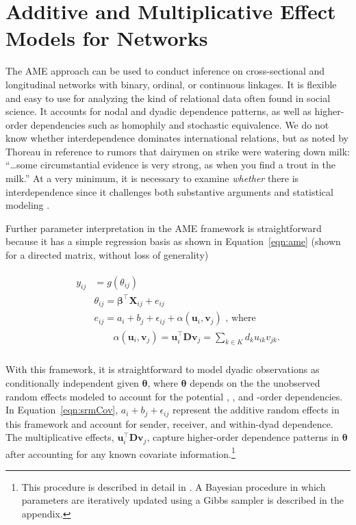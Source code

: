 \section{\textbf{Additive and Multiplicative Effect Models for Networks}}

The AME approach can be used to conduct inference on cross-sectional and longitudinal networks with binary, ordinal, or continuous linkages. It is flexible and easy to use for analyzing the kind of relational data often found in social science. It accounts for nodal and dyadic dependence patterns, as well as higher-order dependencies such as homophily and stochastic equivalence.  We do not know whether interdependence dominates international relations, but as noted by Thoreau in reference to rumors that dairymen on strike were watering down milk: ``\ldots some circumstantial evidence is very strong, as when you find a trout in the milk.'' At a very minimum, it is necessary to examine \textit{whether} there is interdependence since it challenges both substantive arguments and statistical modeling \citep{snijders:2011}. 

Further parameter interpretation in the AME framework is straightforward because it has a simple regression basis as shown in Equation~\ref{eqn:ame} (shown for a directed matrix, without loss of generality) \:

\begin{align}
\begin{aligned}
	y_{ij} &= g(\theta_{ij}) \\
	&\theta_{ij} = \bm\beta^{\top} \mathbf{X}_{ij} + e_{ij} \\
	&e_{ij} = a_{i} + b_{j}  + \epsilon_{ij} + \alpha(\textbf{u}_{i}, \textbf{v}_{j}) \text{  , where } \\
	&\qquad \alpha(\textbf{u}_{i}, \textbf{v}_{j}) = \textbf{u}_{i}^{\top} \textbf{D} \textbf{v}_{j} = \sum_{k \in K} d_{k} u_{ik} v_{jk}. \\
\label{eqn:ame}
\end{aligned}
\end{align}

With this framework, it is straightforward to model dyadic observations as conditionally independent given $\bm\theta$, where $\bm\theta$ depends on the the unobserved random effects modeled to account for the potential \first, \second, and \third-order dependencies. In Equation~\ref{eqn:srmCov}, $a_{i} + b_{j}  + \epsilon_{ij}$ represent the additive random effects in this framework and account for sender, receiver, and within-dyad dependence. The multiplicative effects, $\textbf{u}_{i}^{\top} \textbf{D} \textbf{v}_{j}$, capture higher-order dependence patterns in $\bm\theta$ after accounting for any known covariate information.\footnote{This procedure is described in detail in \citet{hoff:2008,hoff:2015:arxiv,minhas:etal:2016:arxiv}. A Bayesian procedure in which parameters are iteratively updated using a Gibbs sampler is described in the appendix.}
